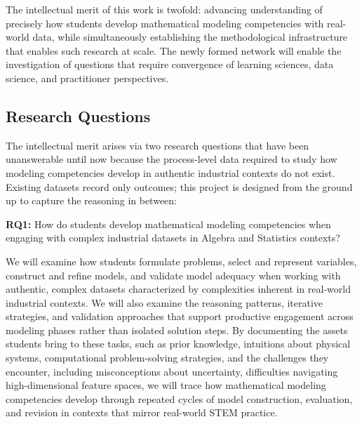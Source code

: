 \documentclass[11pt]{article}
\begin{document}
The intellectual merit of this work is twofold: advancing understanding of precisely how students develop mathematical modeling competencies with real-world data, while simultaneously establishing the methodological infrastructure that enables such research at scale.
The newly formed network will enable the investigation of questions that require convergence of learning sciences, data science, and practitioner perspectives.

\subsection{Research Questions}
The intellectual merit arises via two research questions that have been unanswerable until now because the process-level data required to study how modeling competencies develop in authentic industrial contexts do not exist. Existing datasets record only outcomes; this project is designed from the ground up to capture the reasoning in between:
\vspace{-0.2cm}
\begin{tcolorbox}[colback=mycmykcolor, colframe=black, boxrule=1pt, coltext=black]
\textbf{RQ1:} How do students develop mathematical modeling competencies when engaging with complex industrial datasets in Algebra and Statistics contexts?
\end{tcolorbox}
\vspace{-0.1cm}
We will examine how students formulate problems, select and represent variables, construct and refine models, and validate model adequacy when working with authentic, complex datasets characterized by complexities inherent in real-world industrial contexts.
We will also examine the reasoning patterns, iterative strategies, and validation approaches that support productive engagement across modeling phases rather than isolated solution steps.
By documenting the assets students bring to these tasks, such as prior knowledge, intuitions about physical systems, computational problem-solving strategies, and the challenges they encounter, including misconceptions about uncertainty, difficulties navigating high-dimensional feature spaces, we will trace how mathematical modeling competencies develop through repeated cycles of model construction, evaluation, and revision in contexts that mirror real-world STEM practice.
\end{document}
